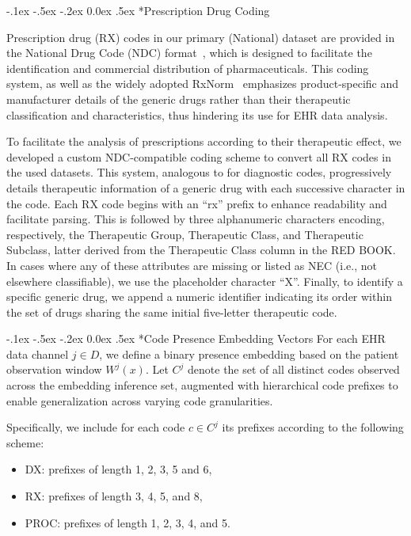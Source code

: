 \documentclass[onecolumn, compsoc,11pt]{IEEEtran}
\makeatletter
\renewcommand\paragraph{\@startsection {section}{1}{\z@}
  {-.1ex \@plus -.5ex \@minus -.2ex}
  {0.0ex \@plus.5ex}
  {\fontsize{11}{10}\selectfont\bfseries\itshape\sffamily}}
\makeatother
\begin{document}
\paragraph*{Prescription Drug Coding}
 
Prescription drug (RX) codes in our primary (National) dataset are provided in the National Drug Code (NDC) format~\cite{FDA_NDC}, which is designed to facilitate the identification and commercial distribution of pharmaceuticals. This coding system, as well as the widely adopted RxNorm~\cite{NLM_RxNorm} emphasizes product-specific and manufacturer details of the generic drugs rather than their therapeutic classification and characteristics, thus hindering its use for EHR data analysis.




  




To facilitate the analysis of prescriptions according to their therapeutic effect, we developed a custom NDC-compatible coding scheme to convert all RX codes in the used datasets. This system, analogous to \ICD for diagnostic codes, progressively details therapeutic information of a generic drug with each successive character in the code. Each RX code begins with an ``rx'' prefix to enhance readability and facilitate parsing. This is followed by three alphanumeric characters encoding, respectively, the Therapeutic Group, Therapeutic Class, and Therapeutic Subclass, latter derived from the Therapeutic Class column in the RED BOOK. In cases where any of these attributes are missing or listed as NEC (i.e., not elsewhere classifiable), we use the placeholder character ``X''. Finally, to identify a specific generic drug, we append a numeric identifier indicating its order within the set of drugs sharing the same initial five-letter therapeutic code.

\paragraph*{Code Presence Embedding Vectors}
For each EHR data channel $j \in D$, we define a binary presence embedding based on the patient observation window $W^j(x)$. Let $C^j$ denote the set of all distinct codes observed across the embedding inference set, augmented with hierarchical code prefixes to enable generalization across varying code granularities.

Specifically, we include for each code $c \in C^j$ its prefixes according to the following scheme:
\begin{itemize}
    \item DX: prefixes of length 1, 2, 3, 5 and 6,
    \item RX: prefixes of length 3, 4, 5, and 8,
    \item PROC: prefixes of length 1, 2, 3, 4, and 5.
\end{itemize}
\end{document}
